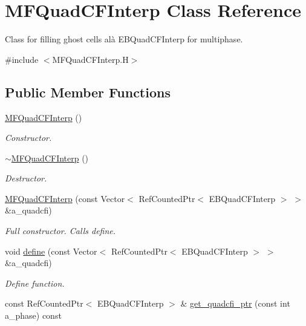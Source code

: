 \hypertarget{classMFQuadCFInterp}{}\section{M\+F\+Quad\+C\+F\+Interp Class Reference}
\label{classMFQuadCFInterp}


Class for filling ghost cells alà E\+B\+Quad\+C\+F\+Interp for multiphase.  




{\ttfamily \#include $<$M\+F\+Quad\+C\+F\+Interp.\+H$>$}

\subsection*{Public Member Functions}
\begin{DoxyCompactItemize}
\item 
\hyperlink{classMFQuadCFInterp_a997e2d5edafe4bbdd2b84dcb1d3d46a2}{M\+F\+Quad\+C\+F\+Interp} ()
\begin{DoxyCompactList}\small\item\em Constructor. \end{DoxyCompactList}\item 
\hyperlink{classMFQuadCFInterp_a63144999061b4920c90c4b970cd28458}{$\sim$\+M\+F\+Quad\+C\+F\+Interp} ()
\begin{DoxyCompactList}\small\item\em Destructor. \end{DoxyCompactList}\item 
\hyperlink{classMFQuadCFInterp_a82623381efaf515a0cb1da3ff53c4539}{M\+F\+Quad\+C\+F\+Interp} (const Vector$<$ Ref\+Counted\+Ptr$<$ E\+B\+Quad\+C\+F\+Interp $>$ $>$ \&a\+\_\+quadcfi)
\begin{DoxyCompactList}\small\item\em Full constructor. Calls define. \end{DoxyCompactList}\item 
void \hyperlink{classMFQuadCFInterp_a9bb41b2a8262ecad73ccb206c55ea579}{define} (const Vector$<$ Ref\+Counted\+Ptr$<$ E\+B\+Quad\+C\+F\+Interp $>$ $>$ \&a\+\_\+quadcfi)
\begin{DoxyCompactList}\small\item\em Define function. \end{DoxyCompactList}\item 
const Ref\+Counted\+Ptr$<$ E\+B\+Quad\+C\+F\+Interp $>$ \& \hyperlink{classMFQuadCFInterp_ad9a63e7b3d0d7544606841c0e25a4639}{get\+\_\+quadcfi\+\_\+ptr} (const int a\+\_\+phase) const 

\end{DoxyCompactItemize}
